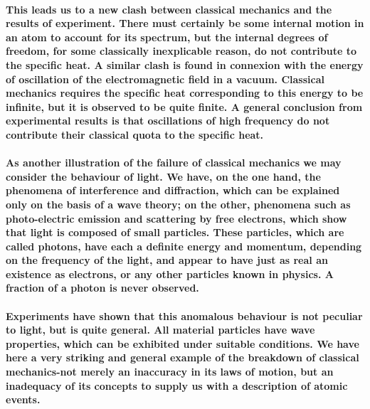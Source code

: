 \documentclass[10pt, kindle, oneside]{kindle}
\begin{document}
\paragraph{This leads us to a new clash between classical mechanics and the results of experiment. There must certainly be some internal motion in an atom to account for its spectrum, but the internal degrees of freedom, for some classically inexplicable reason, do not contribute to the specific heat. A similar clash is found in connexion with the energy of oscillation of the electromagnetic field in a vacuum. Classical mechanics requires the specific heat corresponding to this energy to be infinite, but it is observed to be quite finite. A general conclusion from experimental results is that oscillations of high frequency do not contribute their classical quota to the specific heat.}
\paragraph{As another illustration of the failure of classical mechanics we may consider the behaviour of light. We have, on the one hand, the phenomena of interference and diffraction, which can be explained only on the basis of a wave theory; on the other, phenomena such as photo-electric emission and scattering by free electrons, which show that light is composed of small particles. These particles, which are called photons, have each a definite energy and momentum, depending on the frequency of the light, and appear to have just as real an existence as electrons, or any other particles known in physics. A fraction of a photon is never observed.}
\paragraph{Experiments have shown that this anomalous behaviour is not peculiar to light, but is quite general. All material particles have wave properties, which can be exhibited under suitable conditions. We have here a very striking and general example of the breakdown of classical mechanics-not merely an inaccuracy in its laws of motion, but an inadequacy of its concepts to supply us with a description of atomic events.}
\end{document}
